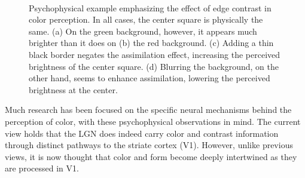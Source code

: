 \documentclass[journal,onecolumn]{IEEEtran}
\begin{document}
\begin{figure}[H]
    \centering
    ~
    ~
    ~
    \caption{Psychophysical example emphasizing the effect of edge contrast in color perception. In all cases, the center square is physically the same. (a) On the green background, however, it appears much brighter than it does on (b) the red background. (c) Adding a thin black border negates the assimilation effect, increasing the perceived brightness of the center square. (d) Blurring the background, on the other hand, seems to enhance assimilation, lowering the perceived brightness at the center.}
    \label{fig:blur-effect}
\end{figure}

Much research has been focused on the specific neural mechanisms behind the perception of color, with these psychophysical observations in mind. The current view holds that the LGN does indeed carry color and contrast information through distinct pathways to the striate cortex (V1). However, unlike previous views, it is now thought that color and form become deeply intertwined as they are processed in V1.
\end{document}
